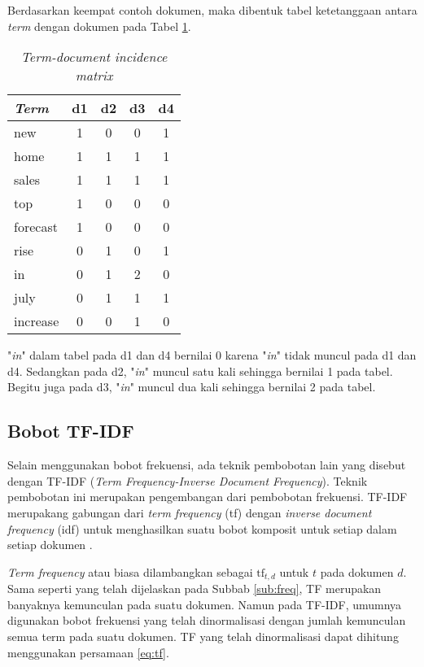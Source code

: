 Berdasarkan keempat contoh dokumen, maka dibentuk tabel ketetanggaan antara \textit{term} dengan dokumen pada Tabel \ref{tbl:term-doc}.

\begin{table}[h]
\centering
\begin{tabular}{|l|c|c|c|c|} \hline
	\textit{Term} & d1 & d2 & d3 & d4 \\ \hline
	new		&	1	&	0	&	0	&	1	\\
	home	&	1	&	1	&	1	&	1	\\
	sales	&	1	&	1	&	1	&	1	\\
	top		&	1	&	0	&	0	&	0	\\
	forecast&	1	&	0	&	0	&	0	\\
	rise	&	0	&	1	&	0	&	1	\\
	in		&	0	&	1	&	2	&	0	\\
	july	&	0	&	1	&	1	&	1	\\
	increase&	0	&	0	&	1	&	0	\\ \hline
\end{tabular}
\caption{\textit{Term-document incidence matrix}}
\label{tbl:term-doc}
\end{table}

\Term "\textit{in}" dalam tabel pada d1 dan d4 bernilai 0 karena \term "\textit{in}" tidak muncul pada d1 dan d4. Sedangkan pada d2, \term "\textit{in}" muncul satu kali sehingga bernilai 1 pada tabel. Begitu juga pada d3, \term "\textit{in}" muncul dua kali sehingga bernilai 2 pada tabel.

\subsection{Bobot TF-IDF}
\label{sub:tf-idf}
Selain menggunakan bobot frekuensi, ada teknik pembobotan lain yang disebut dengan TF-IDF (\textit{Term Frequency-Inverse Document Frequency}). Teknik pembobotan ini merupakan pengembangan dari pembobotan frekuensi. TF-IDF merupakang gabungan dari \textit{term frequency} (tf) dengan \textit{inverse document frequency} (idf) untuk menghasilkan suatu bobot komposit untuk setiap \term dalam setiap dokumen \cite{schutze2008introduction}.

\textit{Term frequency} atau biasa dilambangkan sebagai $\textrm{tf}_{t,d}$ untuk \term $t$ pada dokumen $d$. Sama seperti yang telah dijelaskan pada Subbab \ref{sub:freq}, TF merupakan banyaknya kemunculan \term pada suatu dokumen. Namun pada TF-IDF, umumnya digunakan bobot frekuensi yang telah dinormalisasi dengan jumlah kemunculan semua term pada suatu dokumen. TF yang telah dinormalisasi dapat dihitung menggunakan persamaan \ref{eq:tf}.

